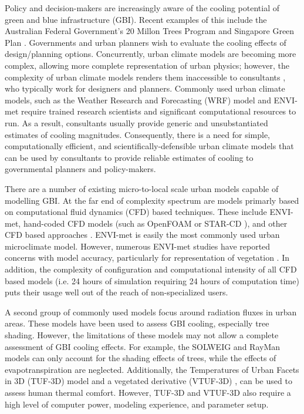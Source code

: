 \documentclass[final,3p,times,authoryear]{elsarticle}
\begin{document}
Policy and decision-makers  are  increasingly aware of the cooling potential of  green and blue infrastructure (GBI). Recent examples of this include the Australian Federal Government's 20 Millon Trees Program \citep{CommonwealthofAustralia2017} and Singapore Green Plan \citep{SMEWR2012}.  Governments and urban planners wish to evaluate the cooling effects of design/planning options. Concurrently, urban climate models are becoming more  complex, allowing more complete representation of  urban physics; however, the complexity of urban climate models renders them inaccessible to consultants \citep{Elasson2000}, who typically work for designers and planners. Commonly used urban climate models, such as the Weather Research and Forecasting (WRF) model 
\citep{Skamarock2008} and ENVI-met \citep{Bruse1999} require trained research scientists and significant computational resources to run. As a result, consultants usually provide generic and unsubstantiated estimates of cooling magnitudes. Consequently, there is a need for simple, computationally efficient, and  scientifically-defensible urban climate models that can be used by consultants to provide reliable estimates of cooling to governmental planners and policy-makers. 

There are a number of existing micro-to-local scale urban models capable of modelling GBI. At the far end of complexity spectrum are models primarly based on computational fluid dynamics (CFD) based techniques. These include ENVI-met, hand-coded  CFD models (such as OpenFOAM \citep{OpenFOAM2011} or STAR-CD \citep{CDadapco2011}), and other CFD based approaches \citep{Bailey2014,Bailey2016,Kunz2000,Schlunzen2011a,Yamada2011,Bruse1999}. ENVI-met is easily the most commonly used urban microclimate model. However, numerous  ENVI-met studies have reported concerns with  model accuracy, particularly for representation of vegetation  \citep{Ali-Toudert2006b,Kruger2011,Acero2015,Spangenberg2008}. In addition, the complexity of configuration and computational intensity of all CFD based models (i.e. 24 hours of simulation requiring 24 hours of computation time) puts their usage well out of the reach of non-specialized users. 

A second group of commonly used models focus around radiation fluxes in urban areas. These models have been used to assess GBI cooling, especially tree shading. However, the limitations of these models may not allow a complete assessment of GBI cooling effects. For example, the SOLWEIG \citep{Lindberg2008a} and RayMan \citep{Matzarakis2007,Matzarakis2010} models can only account for the shading effects of trees, while the effects of evapotranspiration are neglected. Additionally, the Temperatures of Urban Facets in 3D (TUF-3D) model \citep{Krayenhoff2007b} and a vegetated derivative (VTUF-3D) \citep{nice2018}, can be used to assess human thermal comfort. However, TUF-3D and VTUF-3D also require a high level of computer power, modeling experience, and parameter setup.  
\end{document}
